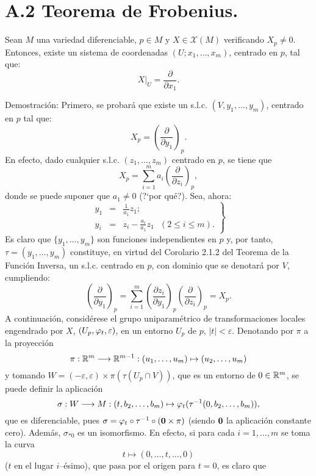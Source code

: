 \documentclass[cursovd_portada.tex]{subfiles}
\begin{document}
\section*{A.2 Teorema de Frobenius.}
\begin{lemaap} Sean $M$ una variedad diferenciable, $p\in M$ y $X\in\mathcal{X}(M)$ verificando $X_p\neq 0$. Entonces,
existe un sistema de coordenadas $(U;x_1,\dots ,x_m)$, centrado en $p$, tal que:
$$X|_U=\frac{\partial}{\partial x_1}.$$
\end{lemaap}
{\sc Demostraci\'{o}n:} Primero, se probar\'{a} que existe un s.l.c. $(V,y_1,\dots , y_m)$, centrado en $p$ tal que:
$$X_p=\left(\frac{\partial}{\partial y_1}\right)_p.$$
\hs En efecto, dado cualquier s.l.c. $(z_1,\dots ,z_m)$ centrado en $p$, se tiene que
$$X_p=\sum_{i=1}^ma_i(\frac{\partial}{\partial z_i})_p,$$
donde se puede suponer que $a_1\neq 0$ (?`por qu\'{e}?). Sea, ahora:
$$\left .
\begin{array}{lll}
y_1 & = & \displaystyle{\frac{1}{a_1}}z_1;\\
y_i & = & z_i-\displaystyle{\frac{a_i}{a_1}}z_1\mbox{ }(2\leq i\leq m).
\end{array}
\right \}
$$
\hs Es claro que $\{y_1,\dots ,y_m\}$ son funciones independientes en $p$ y, por tanto, $\tau=(y_1,\dots ,y_m)$
constituye, en virtud del Corolario 2.1.2 del Teorema de la Funci\'{o}n Inversa, un s.l.c. centrado en $p$, con
dominio que se denotar\'{a} por $V$, cum\-plien\-do:
$$\left(\frac{\partial}{\partial y_1}\right)_p=\sum_{i=1}^m(\frac{\partial z_i}{\partial
y_1})_p(\frac{\partial}{\partial z_i})_p=X_p.$$ \hs A continuaci\'{o}n, consid\'{e}rese el grupo uniparam\'{e}trico de
transformaciones locales engendrado por $X$, $(U_p,\varphi_t,\varepsilon)$, en un entorno $U_p$ de $p$, $\vert t\vert
<\varepsilon$. Denotando por $\pi$ a la proyecci\'{o}n
$$\pi:\mathbb{R}^m\longrightarrow\mathbb{R}^{m-1}:(u_1,\dots ,u_m)\mapsto (u_2,\dots ,u_m)$$
y tomando $W=(-\varepsilon,\varepsilon)\times\pi(\tau(U_p\cap V))$, que es un entorno de $0\in\mathbb{R}^m$, se puede definir la
aplicaci\'{o}n
$$\sigma:W\longrightarrow M:(t,b_2,\dots ,b_m)\mapsto\varphi_t(\tau^{-1}(0,b_2,\dots ,b_m)),$$
que es diferenciable, pues $\sigma=\varphi_t\circ\tau^{-1}\circ({\bf 0}\times\pi)$ (siendo ${\bf 0}$ la aplicaci\'{o}n
constante cero). Adem\'{a}s, $\sigma_{*0}$ es un isomorfismo. En efecto, si para cada $i=1,\dots ,m$ se toma la curva
$$t\mapsto (0,\dots ,t,\dots ,0)$$
($t$ en el lugar $i$--\'{e}simo), que pasa por el origen para $t=0$, es claro que
\end{document}
